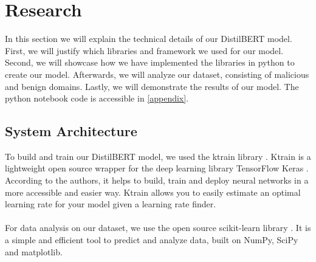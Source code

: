 \chapter{Research}\label{research}

In this section we will explain the technical details of our DistilBERT model. First, we will justify which libraries and framework we used for our model. Second, we will showcase how we have implemented the libraries in python to create our model. Afterwards, we will analyze our dataset, consisting of malicious and benign domains. Lastly, we will demonstrate the results of our model. The python notebook code is accessible in \ref{appendix}.

\section{System Architecture}
To build and train our DistilBERT model, we used the ktrain library \cite{maiya2020ktrain}. Ktrain is a lightweight open source wrapper for the deep learning library TensorFlow Keras \cite{chollet2015keras}. According to the authors, it helps to build, train and deploy neural networks in a more accessible and easier way. Ktrain allows you to easily estimate an optimal learning rate for your model given a learning rate finder.\\\\
For data analysis on our dataset, we use the open source scikit-learn library \cite{sklearn_api}. It is a simple and efficient tool to predict and analyze data, built on NumPy, SciPy and matplotlib.


